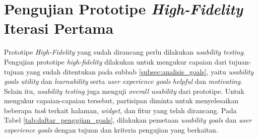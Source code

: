 \section{Pengujian Prototipe \textit{High-Fidelity} Iterasi Pertama}
\label{sec:test_1}

Prototipe \textit{High-Fidelity} yang sudah dirancang perlu dilakukan \textit{usability testing}. Pengujian prototipe \textit{high-fidelity} dilakukan untuk mengukur capaian dari tujuan-tujuan yang sudah ditentukan pada subbab \ref{subsec:analisis_goals}, yaitu \textit{usability goals} \textit{utility} dan \textit{learnability} serta \textit{user experience goals} \textit{helpful} dan \textit{motivating}. Selain itu, \textit{usability testing} juga menguji \textit{overall usability} dari prototipe. Untuk mengukur capaian-capaian tersebut, partisipan diminta untuk menyelesaikan beberapa \textit{task} terkait halaman, \textit{widget}, dan fitur yang telah dirancang. Pada Tabel \ref{tab:daftar_pengujian_goals}, dilakukan pemetaan \textit{usability goals} dan \textit{user experience goals} dengan tujuan dan kriteria pengujian yang berkaitan.

